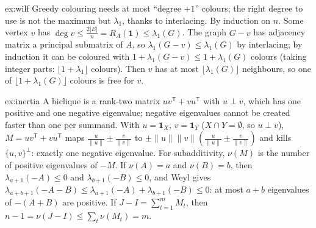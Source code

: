 \begin{solution}{ex:wilf}
\idea Greedy colouring needs at most ``degree $+1$'' colours; the right degree to use is not the maximum but $\lambda_1$, thanks to
interlacing.
\writeup By induction on $n$. Some vertex $v$ has $\deg v\le\frac{2|E|}n=R_A(\mathbf 1)\le\lambda_1(G)$. The graph $G-v$ has adjacency
matrix a principal submatrix of $A$, so $\lambda_1(G-v)\le\lambda_1(G)$ by interlacing; by induction it can be coloured with
$1+\lambda_1(G-v)\le1+\lambda_1(G)$ colours (taking integer parts: $\lfloor1+\lambda_1\rfloor$ colours). Then $v$ has at most
$\lfloor\lambda_1(G)\rfloor$ neighbours, so one of $\lfloor1+\lambda_1(G)\rfloor$ colours is free for $v$.
\end{solution}

\begin{solution}{ex:inertia}
\idea A biclique is a rank-two matrix $uv^{\mathsf T}+vu^{\mathsf T}$ with $u\perp v$, which has one positive and one negative eigenvalue;
negative eigenvalues cannot be created faster than one per summand.
\writeup With $u=\mathbf 1_X$, $v=\mathbf 1_Y$ ($X\cap Y=\emptyset$, so $u\perp v$), $M=uv^{\mathsf T}+vu^{\mathsf T}$ maps $\frac u{\|u\|}\pm
\frac v{\|v\|}$ to $\pm\|u\|\|v\|(\frac u{\|u\|}\pm\frac v{\|v\|})$ and kills $\{u,v\}^\perp$: exactly one negative eigenvalue. For
subadditivity, $\nu(M)$ is the number of positive eigenvalues of $-M$. If $\nu(A)=a$ and $\nu(B)=b$, then $\lambda_{a+1}(-A)\le0$ and
$\lambda_{b+1}(-B)\le0$, and Weyl gives $\lambda_{a+b+1}(-A-B)\le\lambda_{a+1}(-A)+\lambda_{b+1}(-B)\le0$: at most $a+b$ eigenvalues of
$-(A+B)$ are positive. If $J-I=\sum_{t=1}^mM_t$, then $n-1=\nu(J-I)\le\sum_t\nu(M_t)=m$.
\end{solution}

